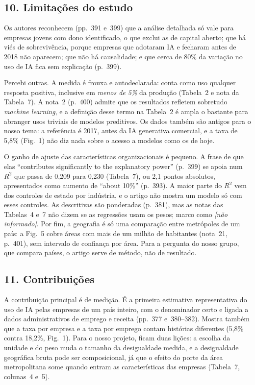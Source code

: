\subsection*{10. Limitações do estudo}
Os autores reconhecem (pp.~391 e~399) que a análise detalhada só vale para empresas jovens com dono
identificado, o que exclui as de capital aberto; que há viés de sobrevivência, porque empresas que
adotaram IA e fecharam antes de 2018 não aparecem; que não há causalidade; e que cerca de 80\% da
variação no uso de IA fica sem explicação (p.~399).

Percebi outras. A medida é frouxa e autodeclarada: conta como uso qualquer resposta positiva,
inclusive em \emph{menos de 5\%} da produção (Tabela~2 e nota da Tabela~7). A nota~2 (p.~400)
admite que os resultados refletem sobretudo \emph{machine learning}, e a definição desse termo na
Tabela~2 é ampla o bastante para abranger usos triviais de modelos preditivos. Os dados também são
antigos para o nosso tema: a referência é 2017, antes da IA generativa comercial, e a taxa de 5,8\%
(Fig.~1) não diz nada sobre o acesso a modelos como os de hoje.

O ganho de ajuste das características organizacionais é pequeno. A frase de que elas
``contributes significantly to the explanatory power'' (p.~399) se apoia num $R^2$ que passa de
0,209 para 0,230 (Tabela~7), ou 2,1 pontos absolutos, apresentados como aumento de ``about 10\%''
(p.~393). A maior parte do $R^2$ vem dos controles de estado por indústria, e o artigo não mostra um
modelo só com esses controles. As descritivas são ponderadas (p.~381), mas as notas das Tabelas~4
e~7 não dizem se as regressões usam os pesos; marco como \emph{[não informado]}. Por fim, a
geografia é só uma comparação entre metrópoles de um país: a Fig.~5 cobre áreas com mais de um
milhão de habitantes (nota~21, p.~401), sem intervalo de confiança por área. Para a pergunta do
nosso grupo, que compara países, o artigo serve de método, não de resultado.

\subsection*{11. Contribuições}
A contribuição principal é de medição. É a primeira estimativa representativa do uso de IA pelas
empresas de um país inteiro, com o denominador certo e ligada a dados administrativos de emprego e
receita (pp.~377 e~380--382). Mostra também que a taxa por empresa e a taxa por emprego contam
histórias diferentes (5,8\% contra 18,2\%, Fig.~1). Para o nosso projeto, ficam duas lições: a
escolha da unidade e do peso muda o tamanho da desigualdade medida, e a desigualdade geográfica
bruta pode ser composicional, já que o efeito do porte da área metropolitana some quando entram as
características das empresas (Tabela~7, colunas~4 e~5).

